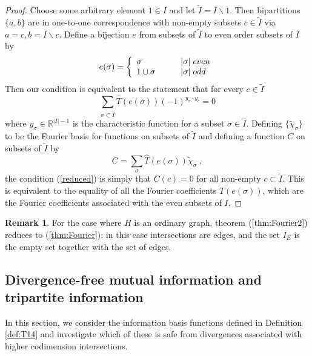 \documentclass[12pt]{article}
\theoremstyle{definition}
\newtheorem{remark}[theorem]{Remark}
\begin{document}
\begin{proof}
Choose some arbitrary element $1 \in I$ and let $\tilde{I} = I \backslash 1$. Then bipartitions $\{a,b\}$ are in one-to-one correspondence with non-empty subsets $c \in \tilde{I}$ via $a= c, b = I \backslash c$. Define a bijection $e$ from subsets of $\tilde{I}$ to even order subsets of $I$ by 
\[
e(\sigma) = \left\{ \begin{array}{ll} \sigma & \qquad |\sigma| \; even \cr
{1} \cup \sigma & \qquad |\sigma| \; odd \cr
\end{array}
\right.
\]
Then our condition is equivalent to the statement that for every $c \in \tilde{I}$
\begin{equation}
\label{reduced}
\sum_{\sigma \subset \tilde{I}} \hat{T}(e(\sigma)) (-1)^{y_\sigma \cdot y_c} = 0
\end{equation}
where $y_\sigma \in \mathbb{R}^{|I| - 1}$ is the characteristic function for a subset $\sigma \in \tilde{I}$. Defining $\{\tilde{\chi}_\sigma\}$ to be the Fourier basis for functions on subsets of $\tilde{I}$ and defining a function $C$ on subsets of $\tilde{I}$ by
\[
C = \sum_\sigma \hat{T}(e(\sigma)) \tilde{\chi}_\sigma \; ,
\]
the condition (\ref{reduced}) is simply that $C(c) = 0$ for all non-empty $c \subset \tilde{I}$. This is equivalent to the equality of all the Fourier coefficients $\hat{T}(e(\sigma))$, which are the Fourier coefficients associated with the even subsets of $I$. 
\end{proof}
\begin{remark}
    For the case where $H$ is an ordinary graph, theorem $(\ref{thm:Fourier2})$ reduces to (\ref{thm:Fourier}): in this case intersections are edges, and the set $I_E$ is the empty set together with the set of edges.
\end{remark}

\subsection{Divergence-free mutual information and tripartite information}

In this section, we consider the information basis functions defined in Definition \ref{def:T14} and investigate which of these is safe from divergences associated with higher codimension intersections.
\end{document}
